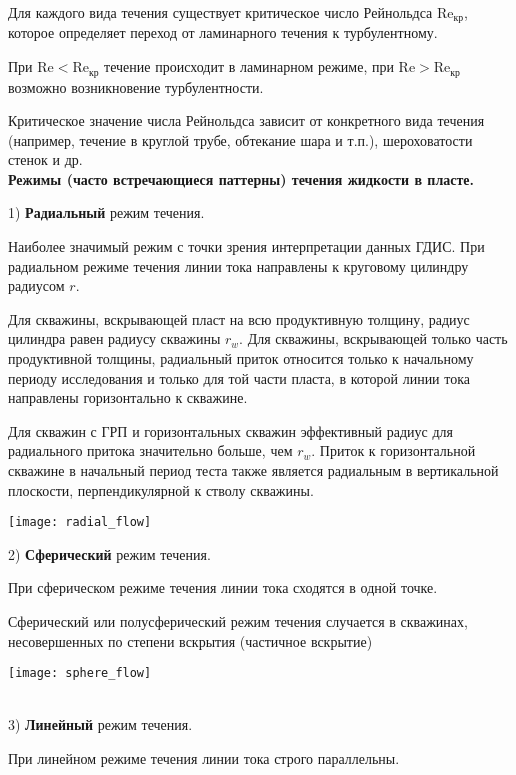 Для каждого вида течения существует критическое число Рейнольдса $\text{Re}_\text{кр}$, которое определяет переход от ламинарного течения к турбулентному.

При $\text{Re}<\text{Re}_\text{кр}$ течение происходит в ламинарном режиме, при $\text{Re}>\text{Re}_\text{кр}$ возможно возникновение турбулентности.

Критическое значение числа Рейнольдса зависит от конкретного вида течения (например, течение в круглой трубе, обтекание шара и т.п.), шероховатости стенок и др.
\\

\textbf{Режимы (часто встречающиеся паттерны) течения жидкости в пласте.}

1) \textbf{Радиальный} режим течения.

Наиболее значимый режим с точки зрения интерпретации данных ГДИС.
При радиальном режиме течения линии тока направлены к круговому цилиндру радиусом $r$.

Для скважины, вскрывающей пласт на всю продуктивную толщину, радиус цилиндра равен радиусу скважины $r_w$.
Для скважины, вскрывающей только часть продуктивной толщины, радиальный приток относится только к начальному периоду исследования и только для той части пласта, в которой линии тока направлены горизонтально к скважине.

Для скважин с ГРП и горизонтальных скважин эффективный радиус для радиального притока значительно больше, чем $r_w$.
Приток к горизонтальной скважине в начальный период теста также является радиальным в вертикальной плоскости, перпендикулярной к стволу скважины.

\begin{center}
\texttt{[image: radial\_flow]}
\end{center}

2) \textbf{Сферический} режим течения.

При сферическом режиме течения линии тока сходятся в одной точке.

Сферический или полусферический режим течения случается в скважинах, несовершенных по степени вскрытия (частичное вскрытие)

\begin{center}
\texttt{[image: sphere\_flow]}
\end{center}
\ \\

3) \textbf{Линейный} режим течения.

При линейном режиме течения линии тока строго параллельны.


